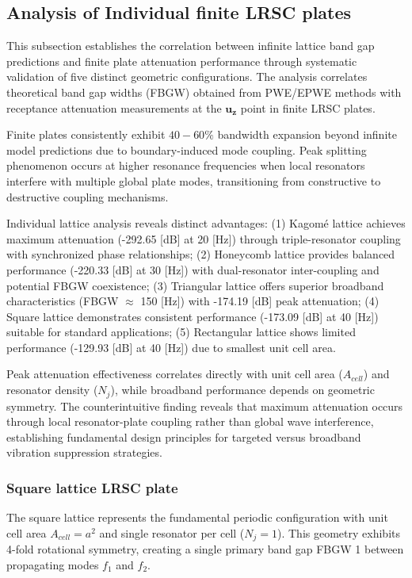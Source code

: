 \documentclass[review,numbers,sort&compress]{elsarticle}
\begin{document}
{\subsection{Analysis of Individual finite LRSC plates}\label{indi_panel_lats}
This subsection establishes the correlation between infinite lattice band gap predictions and finite plate attenuation performance through systematic validation of five distinct geometric configurations. The analysis correlates theoretical band gap widths (FBGW) obtained from PWE/EPWE methods with receptance attenuation measurements at the $\mathbf{u_z}$ point in finite LRSC plates.

Finite plates consistently exhibit $40-60\%$ bandwidth expansion beyond infinite model predictions due to boundary-induced mode coupling. Peak splitting phenomenon occurs at higher resonance frequencies when local resonators interfere with multiple global plate modes, transitioning from constructive to destructive coupling mechanisms.

Individual lattice analysis reveals distinct advantages: (1) Kagomé lattice achieves maximum attenuation (-292.65 [dB] at 20 [Hz]) through triple-resonator coupling with synchronized phase relationships; (2) Honeycomb lattice provides balanced performance (-220.33 [dB] at 30 [Hz]) with dual-resonator inter-coupling and potential FBGW coexistence; (3) Triangular lattice offers superior broadband characteristics (FBGW $\approx$ 150 [Hz]) with -174.19 [dB] peak attenuation; (4) Square lattice demonstrates consistent performance (-173.09 [dB] at 40 [Hz]) suitable for standard applications; (5) Rectangular lattice shows limited performance (-129.93 [dB] at 40 [Hz]) due to smallest unit cell area.

Peak attenuation effectiveness correlates directly with unit cell area ($A_{cell}$) and resonator density ($N_j$), while broadband performance depends on geometric symmetry. The counterintuitive finding reveals that maximum attenuation occurs through local resonator-plate coupling rather than global wave interference, establishing fundamental design principles for targeted versus broadband vibration suppression strategies.

\subsubsection{Square lattice LRSC plate}\label{panel_lat_s}

The square lattice represents the fundamental periodic configuration with unit cell area $A_{cell} = a^2$ and single resonator per cell ($N_j = 1$). This geometry exhibits 4-fold rotational symmetry, creating a single primary band gap FBGW 1 between propagating modes $f_1$ and $f_2$. 

}
\end{document}
